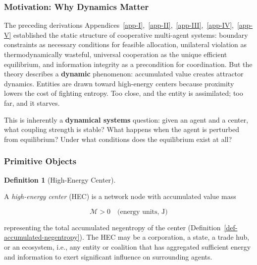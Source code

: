 \documentclass[11pt]{article}
\theoremstyle{plain}
\theoremstyle{definition}
\newtheorem{definition}{Definition}
\theoremstyle{remark}
\let\origsubsubsection\subsubsection
\renewcommand{\subsubsection}{\needspace{4\baselineskip}\origsubsubsection}
\begin{document}
\subsubsection{Motivation: Why Dynamics
Matter}\label{motivation-why-dynamics-matter}

The preceding derivations
Appendices~\ref{app-I},~\ref{app-II},~\ref{app-III},~\ref{app-IV},~\ref{app-V}
established the static structure of cooperative multi-agent systems:
boundary constraints as necessary conditions for feasible allocation,
unilateral violation as thermodynamically wasteful, universal
cooperation as the unique efficient equilibrium, and information
integrity as a precondition for coordination. But the theory describes a
\textbf{dynamic} phenomenon: accumulated value creates attractor
dynamics. Entities are drawn toward high-energy centers because
proximity lowers the cost of fighting entropy. Too close, and the entity
is assimilated; too far, and it starves.

This is inherently a \textbf{dynamical systems} question: given an agent
and a center, what coupling strength is stable? What happens when the
agent is perturbed from equilibrium? Under what conditions does the
equilibrium exist at all?

\subsubsection{Primitive Objects}\label{primitive-objects}

\begin{definition}[High-Energy Center]
\label{def-high-energy-center}

A \emph{high-energy center} (HEC) is a network node with accumulated value mass

$$\mathcal{M} > 0 \quad \text{(energy units, J)}$$

representing the total accumulated negentropy of the center (Definition~\ref{def-accumulated-negentropy}). The HEC may be a corporation, a state, a trade hub, or an ecosystem, i.e., any entity or coalition that has aggregated sufficient energy and information to exert significant influence on surrounding agents.
\end{definition}
\end{document}
